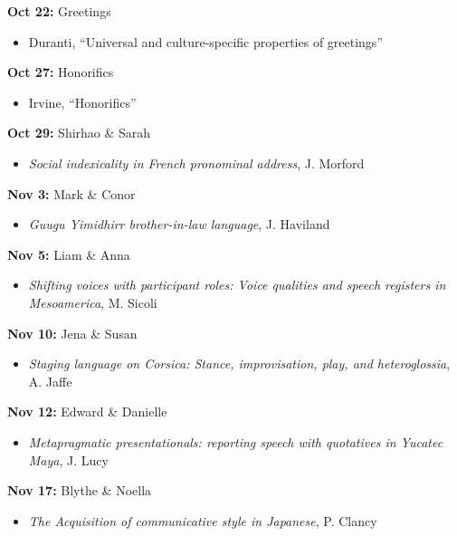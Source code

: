 \documentclass[12pt]{article}
\providecommand{\tightlist}{%
  \setlength{\itemsep}{0pt}\setlength{\parskip}{0pt}}
\begin{document}
\textbf{Oct 22:} Greetings

\begin{itemize}
\tightlist
\item
  Duranti, ``Universal and culture-specific properties of greetings''
\end{itemize}

\textbf{Oct 27:} Honorifics

\begin{itemize}
\tightlist
\item
  Irvine, ``Honorifics''
\end{itemize}

\textbf{Oct 29:} Shirhao \& Sarah

\begin{itemize}
\tightlist
\item
  \emph{Social indexicality in French pronominal address}, J. Morford
\end{itemize}

\textbf{Nov 3:} Mark \& Conor

\begin{itemize}
\tightlist
\item
  \emph{Guugu Yimidhirr brother-in-law language}, J. Haviland
\end{itemize}

\textbf{Nov 5:} Liam \& Anna

\begin{itemize}
\tightlist
\item
  \emph{Shifting voices with participant roles: Voice qualities and
  speech registers in Mesoamerica}, M. Sicoli
\end{itemize}

\textbf{Nov 10:} Jena \& Susan

\begin{itemize}
\tightlist
\item
  \emph{Staging language on Corsica: Stance, improvisation, play, and
  heteroglossia}, A. Jaffe
\end{itemize}

\textbf{Nov 12:} Edward \& Danielle

\begin{itemize}
\tightlist
\item
  \emph{Metapragmatic presentationals: reporting speech with quotatives
  in Yucatec Maya}, J. Lucy
\end{itemize}

\textbf{Nov 17:} Blythe \& Noella

\begin{itemize}
\tightlist
\item
  \emph{The Acquisition of communicative style in Japanese}, P. Clancy
\end{itemize}
\end{document}
